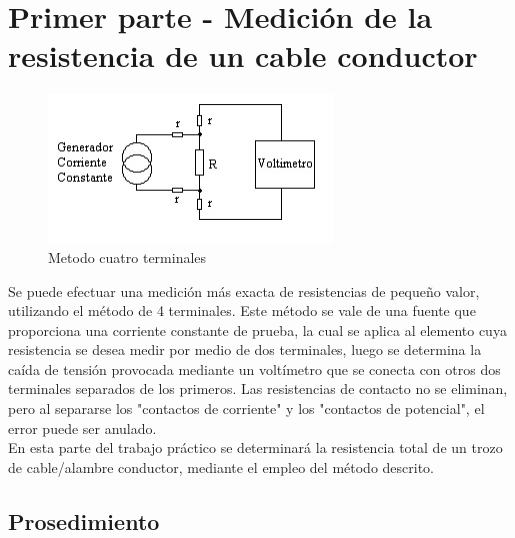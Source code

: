 \documentclass[12pt, letterpaper]{article}
\begin{document}
\section{Primer parte - Medición de la resistencia de un cable conductor}

\begin{figure}[h]
	\centering
	\includegraphics{Imagenes/met_4_terminales.jpg}
	\caption{Metodo cuatro terminales}
\end{figure}

Se puede efectuar una medición más exacta de resistencias de pequeño valor, utilizando el método de 4 terminales. 
Este método se vale de una fuente que proporciona una corriente constante de prueba, la cual se aplica al elemento cuya resistencia
se desea medir por medio de dos terminales, luego se determina la caída de tensión provocada
mediante un voltímetro que se conecta con otros dos terminales separados de los primeros.
Las resistencias de contacto no se eliminan, pero al separarse los "contactos de corriente" y
los "contactos de potencial", el error puede ser anulado.
\\
En esta parte del trabajo práctico se determinará la resistencia total de un
trozo de cable/alambre conductor, mediante el empleo del método descrito. 
\\




\subsection{Prosedimiento}
\end{document}
